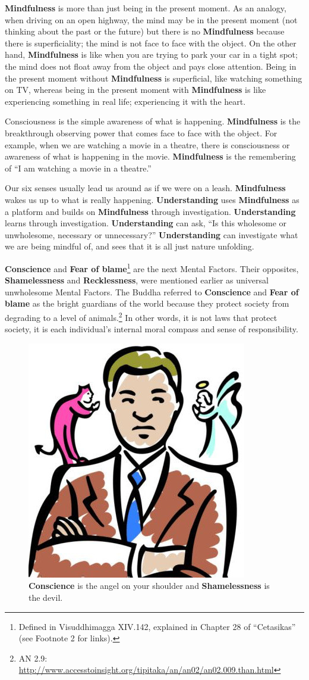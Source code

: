\textbf{Mindfulness} is more than just being in the present moment. As an analogy, when driving on an open highway, the mind may be in the present moment (not thinking about the past or the future) but there is no \textbf{Mindfulness} because there is superficiality; the mind is not face to face with the object. On the other hand, \textbf{Mindfulness} is like when you are trying to park your car in a tight spot; the mind does not float away from the object and pays close attention. Being in the present moment without \textbf{Mindfulness} is superficial, like watching something on TV, whereas being in the present moment with \textbf{Mindfulness} is like experiencing something in real life; experiencing it with the heart.

Consciousness is the simple awareness of what is happening. \textbf{Mindfulness} is the breakthrough observing power that comes face to face with the object. For example, when we are watching a movie in a theatre, there is consciousness or awareness of what is happening in the movie. \textbf{Mindfulness} is the remembering of “I am watching a movie in a theatre.” 

Our six senses usually lead us around as if we were on a leash. \textbf{Mindfulness} wakes us up to what is really happening. \textbf{Understanding} uses \textbf{Mindfulness} as a platform and builds on \textbf{Mindfulness} through investigation. \textbf{Understanding} learns through investigation. \textbf{Understanding} can ask, “Is this wholesome or unwholesome, necessary or unnecessary?” \textbf{Understanding} can investigate what we are being mindful of, and sees that it is all just nature unfolding.

\textbf{Conscience} and \textbf{Fear of blame}\footnote{Defined in Visuddhimagga XIV.142, explained in Chapter 28 of “Cetasikas” (see Footnote 2 for links).} are the next Mental Factors. Their opposites, \textbf{Shamelessness} and \textbf{Recklessness}, were mentioned earlier as universal unwholesome Mental Factors. The Buddha referred to \textbf{Conscience} and \textbf{Fear of blame} as the bright guardians of the world because they protect society from degrading to a level of animals.\footnote{AN 2.9: \url{http://www.accesstoinsight.org/tipitaka/an/an02/an02.009.than.html}} In other words, it is not laws that protect society, it is each individual’s internal moral compass and sense of responsibility.

\begin{figure}[H]
\centering
\includegraphics[width=0.3\linewidth]{./Diagrams/AngelDevil}
\caption{\textbf{Conscience} is the angel on your shoulder and \textbf{Shamelessness} is the devil.}
\label{fig:AngelDevil}
\end{figure}

